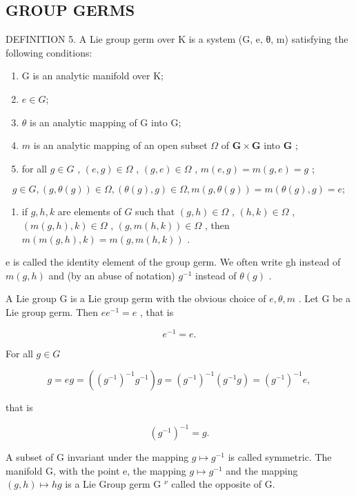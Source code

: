 \subsection{GROUP GERMS}

DEFINITION 5. A Lie group germ over K is a system (G, e, θ, m) satisfying the following conditions:

\begin{enumerate}
\def\labelenumi{(\roman{enumi})}
\item
  G is an analytic manifold over K;
\item
  \(e \in G;\)
\item
  \(\theta\) is an analytic mapping of G into G;
\item
  \(m\) is an analytic mapping of an open subset \(\Omega\) of \(\mathbf{G} \times \mathbf{G}\) into \(\mathbf{G}\) ;
\item
  for all \(g \in G\) , \((e, g) \in \Omega\) , \((g, e) \in \Omega\) , \(m(e, g) = m(g, e) = g\) ;
\end{enumerate}

\[
g \in G, (g, \theta (g)) \in \Omega , (\theta (g), g) \in \Omega , m (g, \theta (g)) = m (\theta (g), g) = e;
\]

\begin{enumerate}
\def\labelenumi{(\roman{enumi})}
\setcounter{enumi}{6}
\tightlist
\item
  if \(g, h, k\) are elements of \(G\) such that \((g, h) \in \Omega\) , \((h, k) \in \Omega\) , \((m(g, h), k) \in \Omega\) , \((g, m(h, k)) \in \Omega\) , then \(m(m(g, h), k) = m(g, m(h, k))\) .
\end{enumerate}

e is called the identity element of the group germ. We often write gh instead of \(m(g, h)\) and (by an abuse of notation) \(g^{-1}\) instead of \(\theta(g)\) .

A Lie group G is a Lie group germ with the obvious choice of \(e, \theta, m\) . Let G be a Lie group germ. Then \(ee^{-1} = e\) , that is

\[
e ^ {- 1} = e.\tag{8}
\]

For all \(g\in G\)

\[
g = e g = ((g ^ {- 1}) ^ {- 1} g ^ {- 1}) g = (g ^ {- 1}) ^ {- 1} (g ^ {- 1} g) = (g ^ {- 1}) ^ {- 1} e,
\]

that is

\[
(g ^ {- 1}) ^ {- 1} = g.\tag{9}
\]

A subset of G invariant under the mapping \(g \mapsto g^{-1}\) is called symmetric. The manifold G, with the point e, the mapping \(g \mapsto g^{-1}\) and the mapping \((g, h) \mapsto hg\) is a Lie Group germ G \(^{\nu}\) called the opposite of G.


